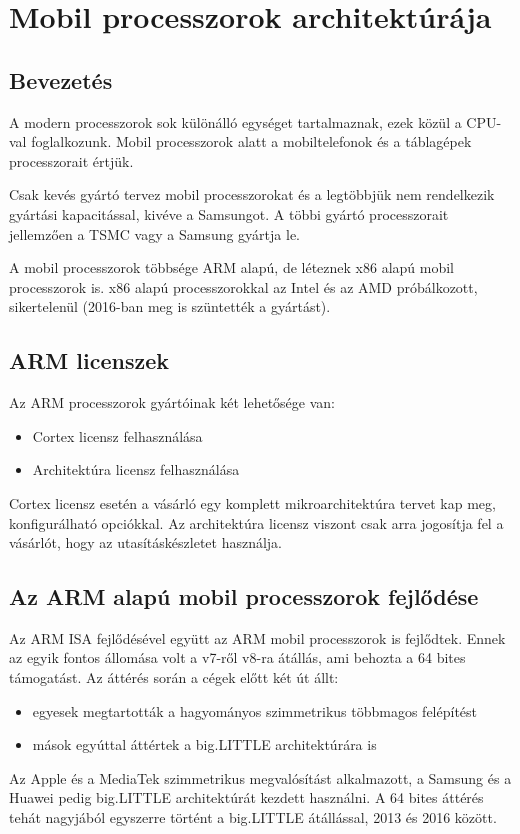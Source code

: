 
\chapter{Mobil processzorok architektúrája}

\section{Bevezetés}
A modern processzorok sok különálló egységet tartalmaznak, ezek közül a CPU-val foglalkozunk.
Mobil processzorok alatt a mobiltelefonok és a táblagépek processzorait értjük.

Csak kevés gyártó tervez mobil processzorokat és a legtöbbjük nem rendelkezik gyártási kapacitással, kivéve a Samsungot.
A többi gyártó processzorait jellemzően a TSMC vagy a Samsung gyártja le.

A mobil processzorok többsége ARM alapú, de léteznek x86 alapú mobil processzorok is.
x86 alapú processzorokkal az Intel és az AMD próbálkozott, sikertelenül (2016-ban meg is szüntették a gyártást).

\section{ARM licenszek}
Az ARM processzorok gyártóinak két lehetősége van:
\begin{itemize}
    \item Cortex licensz felhasználása
    \item Architektúra licensz felhasználása
\end{itemize}

Cortex licensz esetén a vásárló egy komplett mikroarchitektúra tervet kap meg, konfigurálható opciókkal.
Az architektúra licensz viszont csak arra jogosítja fel a vásárlót, hogy az utasításkészletet használja.

\section{Az ARM alapú mobil processzorok fejlődése}
Az ARM ISA fejlődésével együtt az ARM mobil processzorok is fejlődtek.
Ennek az egyik fontos állomása volt a v7-ről v8-ra átállás, ami behozta a 64 bites támogatást.
Az áttérés során a cégek előtt két út állt:
\begin{itemize}
    \item egyesek megtartották a hagyományos szimmetrikus többmagos felépítést
    \item mások egyúttal áttértek a big.LITTLE architektúrára is
\end{itemize}
Az Apple és a MediaTek szimmetrikus megvalósítást alkalmazott, a Samsung és a Huawei pedig big.LITTLE architektúrát kezdett használni.
A 64 bites áttérés tehát nagyjából egyszerre történt a big.LITTLE átállással, 2013 és 2016 között.

